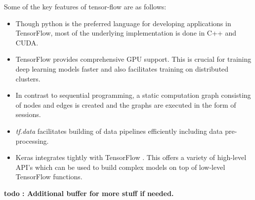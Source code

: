 Some of the key features of tensor-flow are as follows:
\begin{itemize}
	\item Though python is the preferred language for developing applications in TensorFlow, most of the underlying implementation is done in C++ and CUDA.
	
	\item TensorFlow provides comprehensive GPU support. This is crucial for training deep learning models faster and also facilitates training on distributed clusters.
	
	\item In contrast to sequential programming, a static computation graph consisting of nodes and edges is created and the graphs are executed in the form of sessions.
	
	\item \textit{tf.data} facilitates building of data pipelines efficiently including data pre-processing.
	
	\item Keras integrates tightly with TensorFlow \cite{tensorflow_2019}. This offers a variety of high-level API's which can be used to build complex models on top of low-level TensorFlow functions.   
	
\end{itemize}
 




\textbf{ todo : Additional buffer for more stuff if needed.}



